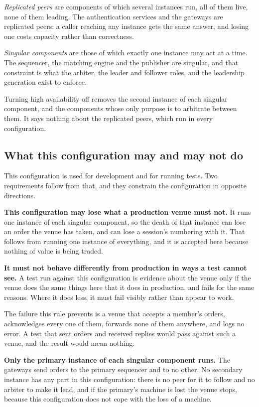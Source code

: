 \emph{Replicated peers} are components of which several instances run, all of
them live, none of them leading. The authentication services and the gateways
are replicated peers: a caller reaching any instance gets the same answer, and
losing one costs capacity rather than correctness.

\emph{Singular components} are those of which exactly one instance may act at a
time. The sequencer, the matching engine and the publisher are singular, and
that constraint is what the arbiter, the leader and follower roles, and the
leadership generation exist to enforce.

Turning high availability off removes the second instance of each singular
component, and the components whose only purpose is to arbitrate between them.
It says nothing about the replicated peers, which run in every configuration.

\subsection{What this configuration may and may not do}
\label{sec:ha:disabled:obligation}

This configuration is used for development and for running tests. Two
requirements follow from that, and they constrain the configuration in opposite
directions.

\textbf{This configuration may lose what a production venue must not.} It runs
one instance of each singular component, so the death of that instance can lose
an order the venue has taken, and can lose a session's numbering with it. That
follows from running one instance of everything, and it is accepted here because
nothing of value is being traded.

\textbf{It must not behave differently from production in ways a test cannot
see.} A test run against this configuration is evidence about the venue only if
the venue does the same things here that it does in production, and fails for the
same reasons. Where it does less, it must fail visibly rather than appear to
work.

The failure this rule prevents is a venue that accepts a member's orders,
acknowledges every one of them, forwards none of them anywhere, and logs no
error. A test that sent orders and received replies would pass against such a
venue, and the result would mean nothing.

\textbf{Only the primary instance of each singular component runs.} The gateways
send orders to the primary sequencer and to no other. No secondary instance has
any part in this configuration: there is no peer for it to follow and no arbiter to
make it lead, and if the primary's machine is lost the venue stops, because this
configuration does not cope with the loss of a machine.


